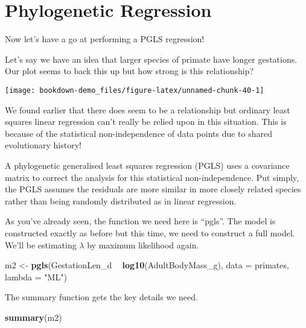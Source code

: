 \documentclass[]{book}
\newenvironment{Shaded}{\begin{snugshade}}{\end{snugshade}}
\newcommand{\KeywordTok}[1]{\textcolor[rgb]{0.13,0.29,0.53}{\textbf{#1}}}
\newcommand{\DataTypeTok}[1]{\textcolor[rgb]{0.13,0.29,0.53}{#1}}
\newcommand{\StringTok}[1]{\textcolor[rgb]{0.31,0.60,0.02}{#1}}
\newcommand{\OperatorTok}[1]{\textcolor[rgb]{0.81,0.36,0.00}{\textbf{#1}}}
\newcommand{\NormalTok}[1]{#1}
\begin{document}
\section{Phylogenetic Regression}\label{phylogenetic-regression}

Now let's have a go at performing a PGLS regression!

Let's say we have an idea that larger species of primate have longer
gestations. Our plot seems to back this up but how strong is this
relationship?

\begin{center}\texttt{[image: bookdown-demo\_files/figure-latex/unnamed-chunk-40-1]} \end{center}

We found earlier that there does seem to be a relationship but ordinary
least squares linear regression can't really be relied upon in this
situation. This is because of the statistical non-independence of data
points due to shared evolutionary history!

A phylogenetic generalised least squares regression (PGLS) uses a
covariance matrix to correct the analysis for this statistical
non-independence. Put simply, the PGLS assumes the residuals are more
similar in more closely related species rather than being randomly
distributed as in linear regression.

As you've already seen, the function we need here is ``pgls''. The model
is constructed exactly as before but this time, we need to construct a
full model. We'll be estimating \(\lambda\) by maximum likelihood again.

\begin{Shaded}
\begin{Highlighting}[]
\NormalTok{m2 <-}\StringTok{ }\KeywordTok{pgls}\NormalTok{(GestationLen_d }\OperatorTok{~}\StringTok{ }\KeywordTok{log10}\NormalTok{(AdultBodyMass_g), }\DataTypeTok{data =}\NormalTok{ primates, }\DataTypeTok{lambda =} \StringTok{"ML"}\NormalTok{)}
\end{Highlighting}
\end{Shaded}

The summary function gets the key details we need.

\begin{Shaded}
\begin{Highlighting}[]
\KeywordTok{summary}\NormalTok{(m2)}
\end{Highlighting}
\end{Shaded}
\end{document}
